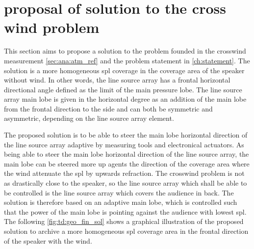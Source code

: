 \section{proposal of solution to the cross wind problem}\label{sec:td:pro_sol_pro}

This section aims to propose a solution to the problem founded in the crosswind measurement \autoref{sec:ana:atm_ref} and the problem statement in \autoref{ch:statement}. 
The solution is a more homogeneous \gls{spl} coverage in the coverage area of the speaker without wind. In other words, the line source array has a frontal horizontal directional angle defined as the  limit of the main pressure lobe. The line source array main lobe is given in the horizontal degree as an addition of the main lobe from the frontal direction to the side and can both be symmetric and asymmetric, depending on the line source array element.

The proposed solution is to be able to steer the main lobe horizontal direction of the line source array adaptive by measuring tools and electronical actuators. 
As being able to steer the main lobe horizontal direction of the line source array, the main lobe can be steered more up agents the direction of the coverage area where the wind attenuate the \gls{spl} by upwards refraction.  The crosswind problem is not as drastically close to the speaker, so the line source array which shall be able to be controlled is the line source array which covers the audience in back. The solution is therefore based on an adaptive main lobe, which is controlled such that the power of the main lobe is pointing against the audience with lowest \gls{spl}. The following \autoref{fig:td:geo_fin_sol} shows a graphical illustration of the proposed solution to archive a more homogeneous \gls{spl} coverage area in the frontal direction of the speaker with the wind.


